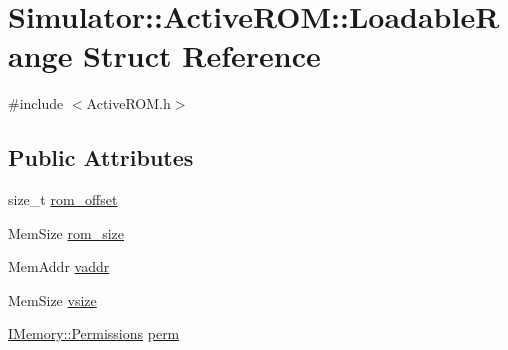 \hypertarget{struct_simulator_1_1_active_r_o_m_1_1_loadable_range}{\section{Simulator\+:\+:Active\+R\+O\+M\+:\+:Loadable\+Range Struct Reference}
\label{struct_simulator_1_1_active_r_o_m_1_1_loadable_range}
}


{\ttfamily \#include $<$Active\+R\+O\+M.\+h$>$}

\subsection*{Public Attributes}
\begin{DoxyCompactItemize}
\item 
size\+\_\+t \hyperlink{struct_simulator_1_1_active_r_o_m_1_1_loadable_range_ae2e5b5cb7ef16e04af659997f70acd8c}{rom\+\_\+offset}
\item 
Mem\+Size \hyperlink{struct_simulator_1_1_active_r_o_m_1_1_loadable_range_af3da98ed9a6fa53214a2baf5882ed014}{rom\+\_\+size}
\item 
Mem\+Addr \hyperlink{struct_simulator_1_1_active_r_o_m_1_1_loadable_range_aeeeaefc2e861f06135c0e4ff292f8190}{vaddr}
\item 
Mem\+Size \hyperlink{struct_simulator_1_1_active_r_o_m_1_1_loadable_range_a7ca4c84b142a8d57aa61fad3fac3f5e4}{vsize}
\item 
\hyperlink{class_simulator_1_1_i_memory_a2d5e2d6d674595532297c0436f15651c}{I\+Memory\+::\+Permissions} \hyperlink{struct_simulator_1_1_active_r_o_m_1_1_loadable_range_aae3709c61e3267c81ef3a58b57ec661f}{perm}
\end{DoxyCompactItemize}


